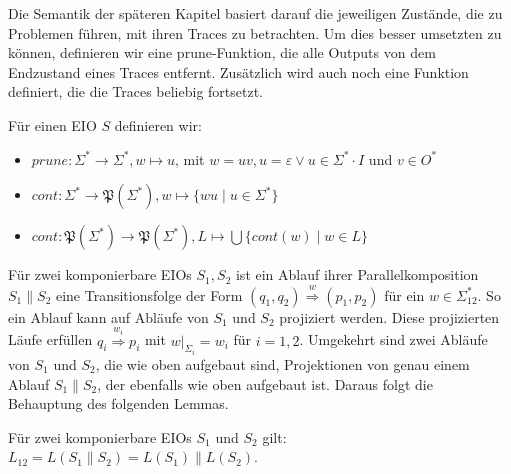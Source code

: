 Die Semantik der späteren Kapitel basiert darauf die jeweiligen Zustände, die
zu Problemen führen, mit ihren Traces zu betrachten. Um dies besser umsetzten zu
können, definieren wir eine prune-Funktion, die alle Outputs von dem Endzustand
eines Traces entfernt. Zusätzlich wird auch noch eine Funktion definiert, die
die Traces beliebig fortsetzt.

\begin{Def}
  Für einen EIO $S$ definieren wir:
  \begin{itemize}
    \item $prune:\Sigma ^*\rightarrow\Sigma ^*, w\mapsto u$, mit $w=uv,
      u=\varepsilon\vee u\in\Sigma ^*\cdot I$ und $v\in O^*$
    \item $cont:\Sigma ^*\rightarrow\mathfrak{P}(\Sigma ^*),
      w\mapsto\{wu\mid u\in\Sigma ^*\}$
    \item $cont:\mathfrak{P}(\Sigma ^*)\rightarrow\mathfrak{P}(\Sigma ^*),
      L\mapsto\bigcup\{cont(w)\mid w\in L\}$
  \end{itemize}
\end{Def}

Für zwei komponierbare EIOs $S_1, S_2$ ist ein Ablauf ihrer
Parallelkomposition $S_1\| S_2$ eine Transitionsfolge der Form $(q_1,q_2)
\overset{w}{\Rightarrow} (p_1,p_2)$ für ein $w\in\Sigma_{12}^*$. So ein Ablauf
kann auf Abläufe von $S_1$ und $S_2$ projiziert werden. Diese projizierten
Läufe erfüllen $q_i \overset{w_i}{\Rightarrow} p_i$ mit $w|_{\Sigma
_i}=w_i$ für $i=1,2$. Umgekehrt sind zwei Abläufe von $S_1$ und $S_2$,
die wie oben aufgebaut sind, Projektionen von genau einem Ablauf
$S_1\|S_2$, der ebenfalls wie oben aufgebaut ist. Daraus folgt die Behauptung
des folgenden Lemmas.

\begin{lem}
  \label{LemmaSprache}
  Für zwei komponierbare EIOs $S_1$ und $S_2$ gilt: $L_{12} = L(S_1\|S_2) =
  L(S_1)\|L(S_2)$.
\end{lem}
